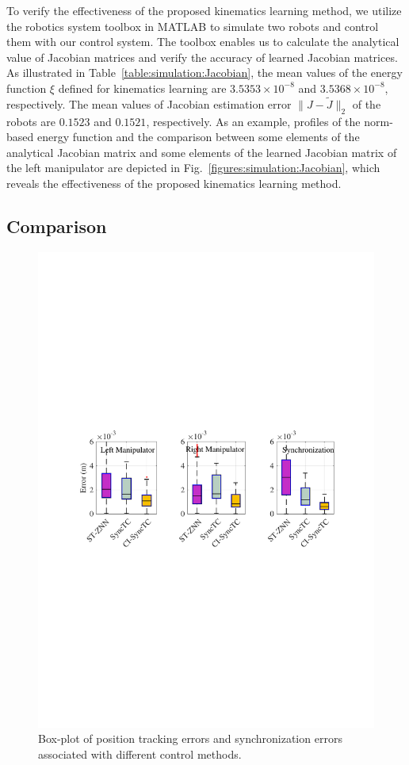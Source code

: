 \documentclass[journal,twoside,web]{ieeecolor}
\begin{document}
To verify the effectiveness of the proposed kinematics learning method, we utilize the robotics system toolbox in MATLAB to simulate two robots and control them with our control system. The toolbox enables us to calculate the analytical value of Jacobian matrices  and verify the accuracy of learned Jacobian matrices. As illustrated in Table~\ref{table:simulation:Jacobian}, the mean values of the energy function $\xi$ defined for kinematics learning are $3.5353\times 10^{-8}$ and $3.5368\times 10^{-8}$, respectively. The mean values of Jacobian estimation error $\|J-\tilde{J}\|_2$ of the robots are $0.1523$ and $0.1521$, respectively. As an example, profiles of the norm-based energy function and the comparison between some elements of the analytical Jacobian matrix and some elements of the learned Jacobian matrix of the left manipulator are depicted in Fig.~\ref{figures:simulation:Jacobian}, which reveals the effectiveness of the proposed kinematics learning method.


\subsection{Comparison}

\begin{figure}[!t]
    \centering
    \includegraphics[width=1\linewidth]{figures/simulation/FIG7_TII-24-5492.pdf}
    \caption{Box-plot of position tracking errors and synchronization errors associated with different control methods.
    }
    \label{Fig:sim:comparison}
\end{figure}
\end{document}
